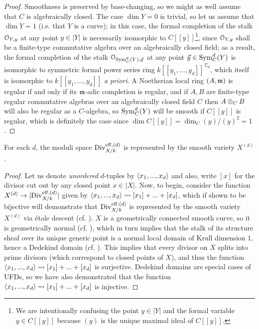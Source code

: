                 \begin{proof}
                    Smoothness is preserved by base-changing, so we might as well assume that $C$ is algebraically closed. The case $\dim Y = 0$ is trivial, so let us assume that $\dim Y = 1$ (i.e. that $Y$ is a curve); in this case, the formal completion of the stalk $\mathcal{O}_{Y, y}$ at any point $y \in |Y|$ is necessarily isomorphic to $C[\![y]\!]$\footnote{We are intentionally confusing the point $y \in |Y|$ and the formal variable $y \in C[\![y]\!]$ because $(y)$ is the unique maximal ideal of $C[\![y]\!]$.}, since $\mathcal{O}_{Y, y}$ shall be a finite-type commutative algebra over an algebraically closed field; as a result, the formal completion of the stalk $\mathcal{O}_{\mathrm{Sym}^d_C(Y), \vec{y}}$ at any point $\vec{y} \in \mathrm{Sym}^d_C(Y)$ is isomorphic to symmetric formal power series ring $k[\![y_1, ..., y_d]\!]^{\Sigma_d}$, which itself is isomorphic to $k[\![y_1, ..., y_d]\!]$ \textit{a priori}. A Noetherian local ring $(A, \mathfrak{m})$ is regular if and only if its $\mathfrak{m}$-adic completion is regular, and if $A, B$ are finite-type regular commutative algebras over an algebraically closed field $C$ then $A \tensor_C B$ will also be regular as a $C$-algebra, so $\mathrm{Sym}_C^d(Y)$ will be smooth if $C[\![y]\!]$ is regular, which is definitely the case since $\dim C[\![y]\!] = \dim_C (y)/(y)^2 = 1$.
                \end{proof}
            \begin{proposition} \label{prop: symmetric_powers_of_curves_parametrise_divisors}
                For each $d$, the moduli space $\mathrm{Div}_{X/k}^{\mathrm{eff}, (d)}$ is represented by the smooth variety $X^{(d)}$.
            \end{proposition}
                \begin{proof}
                    Let us denote \textit{unordered} $d$-tuples by $\langle x_1, ..., x_d\rangle$ and also, write $[x]$ for the divisor cut out by any closed point $x \in |X|$. Now, to begin, consider the function $X^{(d)} \to |\mathrm{Div}_{X/k}^{\mathrm{eff}, (d)}|$ given by $\langle x_1, ..., x_d\rangle \leadsto [x_1] + ... + [x_d]$, which if shown to be bijective will demonstrate that $\mathrm{Div}_{X/k}^{\mathrm{eff}, (d)}$ is represented by the smooth variety $X^{(d)}$ via \'etale descent (cf. \cite[\href{https://stacks.math.columbia.edu/tag/024V}{Tag 024V}]{stacks}). $X$ is a geometrically connected smooth curve, so it is geometrically normal (cf. \cite[\href{https://stacks.math.columbia.edu/tag/056T}{Tag 056T}]{stacks}), which in turn implies that the stalk of its structure sheaf over its unique generic point is a normal local domain of Krull dimension $1$, hence a Dedekind domain (cf. \cite[\href{https://stacks.math.columbia.edu/tag/034X}{Tag 034X}]{stacks}). This implies that every divisor on $X$ splits into prime divisors (which correspond to closed points of $X$), and thus the function $\langle x_1, ..., x_d\rangle \leadsto [x_1] + ... + [x_d]$ is surjective. Dedekind domains are special cases of UFDs, so we have also demonstrated that the function $\langle x_1, ..., x_d\rangle \leadsto [x_1] + ... + [x_d]$ is injective.
                \end{proof}
